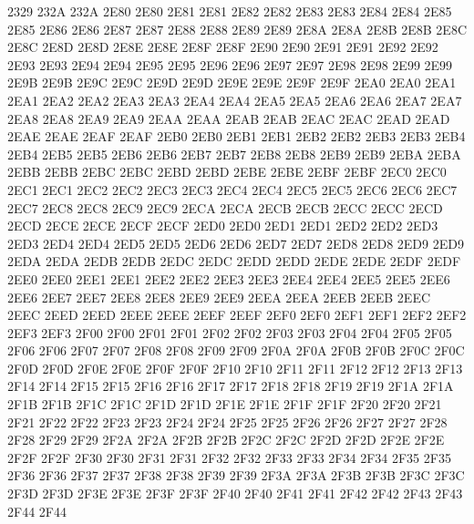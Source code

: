  2329
\CL 232A 232A
\ID 2E80 2E80
\ID 2E81 2E81
\ID 2E82 2E82
\ID 2E83 2E83
\ID 2E84 2E84
\ID 2E85 2E85
\ID 2E86 2E86
\ID 2E87 2E87
\ID 2E88 2E88
\ID 2E89 2E89
\ID 2E8A 2E8A
\ID 2E8B 2E8B
\ID 2E8C 2E8C
\ID 2E8D 2E8D
\ID 2E8E 2E8E
\ID 2E8F 2E8F
\ID 2E90 2E90
\ID 2E91 2E91
\ID 2E92 2E92
\ID 2E93 2E93
\ID 2E94 2E94
\ID 2E95 2E95
\ID 2E96 2E96
\ID 2E97 2E97
\ID 2E98 2E98
\ID 2E99 2E99
\ID 2E9B 2E9B
\ID 2E9C 2E9C
\ID 2E9D 2E9D
\ID 2E9E 2E9E
\ID 2E9F 2E9F
\ID 2EA0 2EA0
\ID 2EA1 2EA1
\ID 2EA2 2EA2
\ID 2EA3 2EA3
\ID 2EA4 2EA4
\ID 2EA5 2EA5
\ID 2EA6 2EA6
\ID 2EA7 2EA7
\ID 2EA8 2EA8
\ID 2EA9 2EA9
\ID 2EAA 2EAA
\ID 2EAB 2EAB
\ID 2EAC 2EAC
\ID 2EAD 2EAD
\ID 2EAE 2EAE
\ID 2EAF 2EAF
\ID 2EB0 2EB0
\ID 2EB1 2EB1
\ID 2EB2 2EB2
\ID 2EB3 2EB3
\ID 2EB4 2EB4
\ID 2EB5 2EB5
\ID 2EB6 2EB6
\ID 2EB7 2EB7
\ID 2EB8 2EB8
\ID 2EB9 2EB9
\ID 2EBA 2EBA
\ID 2EBB 2EBB
\ID 2EBC 2EBC
\ID 2EBD 2EBD
\ID 2EBE 2EBE
\ID 2EBF 2EBF
\ID 2EC0 2EC0
\ID 2EC1 2EC1
\ID 2EC2 2EC2
\ID 2EC3 2EC3
\ID 2EC4 2EC4
\ID 2EC5 2EC5
\ID 2EC6 2EC6
\ID 2EC7 2EC7
\ID 2EC8 2EC8
\ID 2EC9 2EC9
\ID 2ECA 2ECA
\ID 2ECB 2ECB
\ID 2ECC 2ECC
\ID 2ECD 2ECD
\ID 2ECE 2ECE
\ID 2ECF 2ECF
\ID 2ED0 2ED0
\ID 2ED1 2ED1
\ID 2ED2 2ED2
\ID 2ED3 2ED3
\ID 2ED4 2ED4
\ID 2ED5 2ED5
\ID 2ED6 2ED6
\ID 2ED7 2ED7
\ID 2ED8 2ED8
\ID 2ED9 2ED9
\ID 2EDA 2EDA
\ID 2EDB 2EDB
\ID 2EDC 2EDC
\ID 2EDD 2EDD
\ID 2EDE 2EDE
\ID 2EDF 2EDF
\ID 2EE0 2EE0
\ID 2EE1 2EE1
\ID 2EE2 2EE2
\ID 2EE3 2EE3
\ID 2EE4 2EE4
\ID 2EE5 2EE5
\ID 2EE6 2EE6
\ID 2EE7 2EE7
\ID 2EE8 2EE8
\ID 2EE9 2EE9
\ID 2EEA 2EEA
\ID 2EEB 2EEB
\ID 2EEC 2EEC
\ID 2EED 2EED
\ID 2EEE 2EEE
\ID 2EEF 2EEF
\ID 2EF0 2EF0
\ID 2EF1 2EF1
\ID 2EF2 2EF2
\ID 2EF3 2EF3
\ID 2F00 2F00
\ID 2F01 2F01
\ID 2F02 2F02
\ID 2F03 2F03
\ID 2F04 2F04
\ID 2F05 2F05
\ID 2F06 2F06
\ID 2F07 2F07
\ID 2F08 2F08
\ID 2F09 2F09
\ID 2F0A 2F0A
\ID 2F0B 2F0B
\ID 2F0C 2F0C
\ID 2F0D 2F0D
\ID 2F0E 2F0E
\ID 2F0F 2F0F
\ID 2F10 2F10
\ID 2F11 2F11
\ID 2F12 2F12
\ID 2F13 2F13
\ID 2F14 2F14
\ID 2F15 2F15
\ID 2F16 2F16
\ID 2F17 2F17
\ID 2F18 2F18
\ID 2F19 2F19
\ID 2F1A 2F1A
\ID 2F1B 2F1B
\ID 2F1C 2F1C
\ID 2F1D 2F1D
\ID 2F1E 2F1E
\ID 2F1F 2F1F
\ID 2F20 2F20
\ID 2F21 2F21
\ID 2F22 2F22
\ID 2F23 2F23
\ID 2F24 2F24
\ID 2F25 2F25
\ID 2F26 2F26
\ID 2F27 2F27
\ID 2F28 2F28
\ID 2F29 2F29
\ID 2F2A 2F2A
\ID 2F2B 2F2B
\ID 2F2C 2F2C
\ID 2F2D 2F2D
\ID 2F2E 2F2E
\ID 2F2F 2F2F
\ID 2F30 2F30
\ID 2F31 2F31
\ID 2F32 2F32
\ID 2F33 2F33
\ID 2F34 2F34
\ID 2F35 2F35
\ID 2F36 2F36
\ID 2F37 2F37
\ID 2F38 2F38
\ID 2F39 2F39
\ID 2F3A 2F3A
\ID 2F3B 2F3B
\ID 2F3C 2F3C
\ID 2F3D 2F3D
\ID 2F3E 2F3E
\ID 2F3F 2F3F
\ID 2F40 2F40
\ID 2F41 2F41
\ID 2F42 2F42
\ID 2F43 2F43
\ID 2F44 2F44
